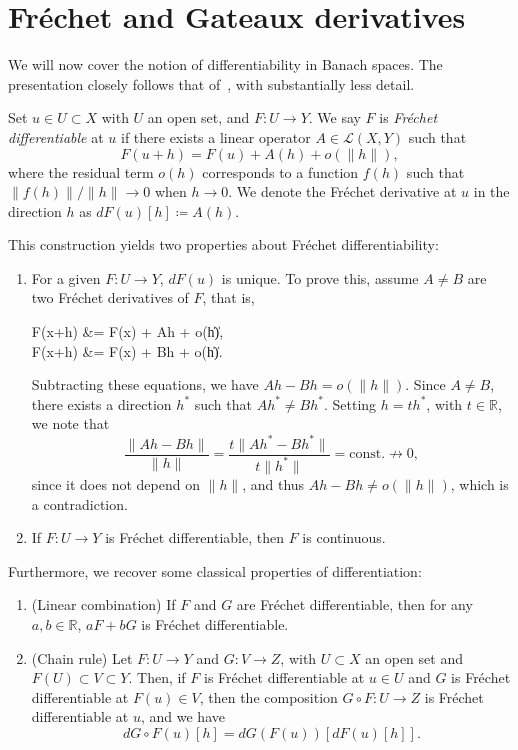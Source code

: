 \section{Fréchet and Gateaux derivatives}\label{sec:frechet-gateaux-derivatives}
We will now cover the notion of differentiability in Banach spaces. The presentation closely follows that of~\cite{ambrosetti1995primer}, with substantially less detail.
\begin{definition}
    Set $u\in U \subset X$ with $U$ an open set, and $F:U\to Y$. We say $F$ is \emph{Fréchet differentiable} at $u$ if there exists a linear operator $A\in \mathcal{L}(X,Y)$ such that
    \begin{equation}\label{eq:frechet-derivative}
        F(u+h)=F(u)+A(h)+o(\|h\|),
    \end{equation}
    where the residual term $o(h)$ corresponds to a function $f(h)$ such that $\|f(h)\|/\|h\| \to 0$ when $h\to 0$. We denote the Fréchet derivative at $u$ in the direction $h$ as $dF(u)[h] \coloneqq A(h)$.
\end{definition}
This construction yields two properties about Fréchet differentiability:
\begin{enumerate}
    \item For a given $F:U\to Y$, $dF(u)$ is unique. To prove this, assume $A\neq B$ are two Fréchet derivatives of $F$, that is, 
    \begin{tightalign*}
            F(x+h) &= F(x) + Ah + o(\|h\|), \\
            F(x+h) &= F(x) + Bh + o(\|h\|).
    \end{tightalign*}
    Subtracting these equations, we have $Ah - Bh = o(\|h\|)$. Since $A\neq B$, there exists a direction $h^*$ such that $Ah^* \neq Bh^*$. Setting $h=th^*$, with $t\in \mathbb{R}$, we note that
    \begin{equation*}
        \frac{\|Ah-Bh\|}{\|h\|} = \frac{t\|Ah^*-Bh^*\|}{t\|h^*\|} = \text{const.} \nrightarrow 0,
    \end{equation*}
    since it does not depend on $\|h\|$, and thus $Ah - Bh \neq o(\|h\|)$, which is a contradiction. 
    \item If $F:U\to Y$ is Fréchet differentiable, then $F$ is continuous.
\end{enumerate}

Furthermore, we recover some classical properties of differentiation:
\begin{enumerate}
    \item (Linear combination) If $F$ and $G$ are Fréchet differentiable, then for any $a,b\in\mathbb{R}$, $aF+bG$ is Fréchet differentiable.
    \item (Chain rule) Let $F:U\to Y$ and $G:V\to Z$, with $U\subset X$ an open set and $F(U)\subset V\subset Y$. Then, if $F$ is Fréchet differentiable at $u\in U$ and $G$ is Fréchet differentiable at $F(u)\in V$, then the composition $G\circ F:U\to Z$ is Fréchet differentiable at $u$, and we have
    \begin{equation*}
        dG\circ F(u)[h] = dG(F(u))[dF(u)[h]].
    \end{equation*}
\end{enumerate}

